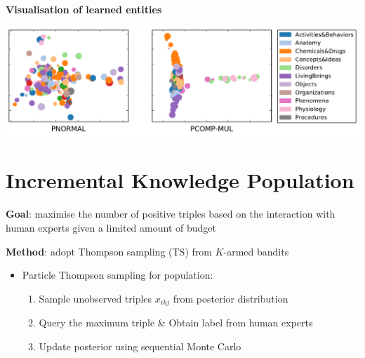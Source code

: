 \documentclass[a0,landscape]{a0poster}
\begin{document}
\begin{multicols}{3}
%
%


\begin{center}
\noindent\textbf{Visualisation of learned entities}
\vspace{.5cm}

\includegraphics[width=0.9\linewidth]{../cikm2016/images/embedding_umls.pdf}
\end{center}


\section{Incremental Knowledge Population}
\textbf{Goal}: maximise the number of positive triples based on the interaction with human experts given a limited amount of budget

\noindent \textbf{Method}: adopt Thompson sampling (TS) from $K$-armed bandits

\begin{itemize}
\item Particle Thompson sampling for population:
\begin{enumerate}
\item Sample unobserved triples $x_{ikj}$ from posterior distribution
\item Query the maximum triple \& Obtain label from human experts
\item Update posterior using sequential Monte Carlo
\end{enumerate}
\end{itemize}


\end{multicols}
\end{document}
